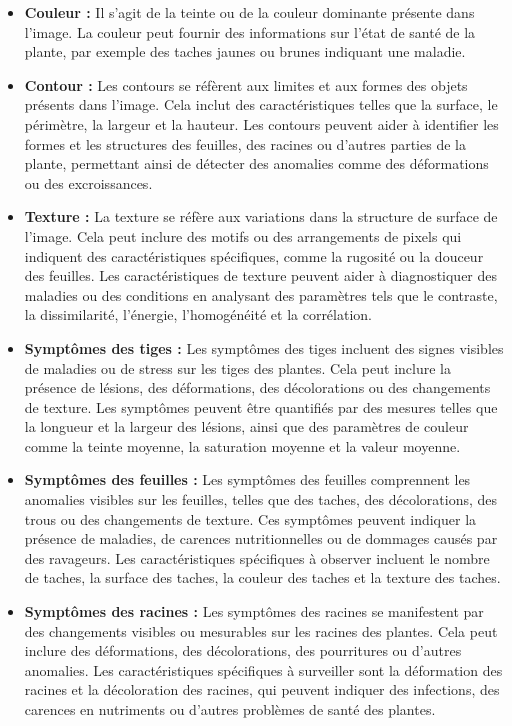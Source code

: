 \begin{itemize}
	\item \textbf{ Couleur :} Il s'agit de la teinte ou de la couleur dominante présente dans l'image. La couleur peut fournir des informations sur l'état de santé de la plante, par exemple des taches jaunes ou brunes indiquant une maladie.
	
	\item \textbf{ Contour :} Les contours se réfèrent aux limites et aux formes des objets présents dans l'image. Cela inclut des caractéristiques telles que la surface, le périmètre, la largeur et la hauteur. Les contours peuvent aider à identifier les formes et les structures des feuilles, des racines ou d'autres parties de la plante, permettant ainsi de détecter des anomalies comme des déformations ou des excroissances.
	
	\item \textbf{ Texture :} La texture se réfère aux variations dans la structure de surface de l'image. Cela peut inclure des motifs ou des arrangements de pixels qui indiquent des caractéristiques spécifiques, comme la rugosité ou la douceur des feuilles. Les caractéristiques de texture peuvent aider à diagnostiquer des maladies ou des conditions en analysant des paramètres tels que le contraste, la dissimilarité, l'énergie, l'homogénéité et la corrélation.
	
	\item \textbf{ Symptômes des tiges :} Les symptômes des tiges incluent des signes visibles de maladies ou de stress sur les tiges des plantes. Cela peut inclure la présence de lésions, des déformations, des décolorations ou des changements de texture. Les symptômes peuvent être quantifiés par des mesures telles que la longueur et la largeur des lésions, ainsi que des paramètres de couleur comme la teinte moyenne, la saturation moyenne et la valeur moyenne.
	
	\item \textbf{ Symptômes des feuilles :} Les symptômes des feuilles comprennent les anomalies visibles sur les feuilles, telles que des taches, des décolorations, des trous ou des changements de texture. Ces symptômes peuvent indiquer la présence de maladies, de carences nutritionnelles ou de dommages causés par des ravageurs. Les caractéristiques spécifiques à observer incluent le nombre de taches, la surface des taches, la couleur des taches et la texture des taches.
	
	\item \textbf{ Symptômes des racines :} Les symptômes des racines se manifestent par des changements visibles ou mesurables sur les racines des plantes. Cela peut inclure des déformations, des décolorations, des pourritures ou d'autres anomalies. Les caractéristiques spécifiques à surveiller sont la déformation des racines et la décoloration des racines, qui peuvent indiquer des infections, des carences en nutriments ou d'autres problèmes de santé des plantes.
	
\end{itemize}


